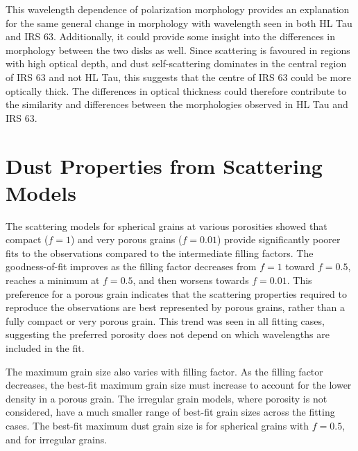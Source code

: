 This wavelength dependence of polarization morphology provides an explanation for the same general change in morphology with wavelength seen in both HL Tau and IRS 63. Additionally, it could provide some insight into the differences in morphology between the two disks as well. Since scattering is favoured in regions with high optical depth, and dust self-scattering dominates in the central region of IRS 63 and not HL Tau, this suggests that the centre of IRS 63 could be more optically thick. The differences in optical thickness could therefore contribute to the similarity and differences between the morphologies observed in HL Tau and IRS 63. 








\section{Dust Properties from Scattering Models}


The scattering models for spherical grains at various porosities showed that compact ($f = 1$) and very porous grains ($f = 0.01$) provide significantly poorer fits to the observations compared to the intermediate filling factors. The goodness-of-fit improves as the filling factor decreases from $f = 1$ toward $f = 0.5$, reaches a minimum at $f = 0.5$, and then worsens towards $f = 0.01$. This preference for a porous grain indicates that the scattering properties required to reproduce the observations are best represented by porous grains, rather than a fully compact or very porous grain. This trend was seen in all fitting cases, suggesting the preferred porosity does not depend on which wavelengths are included in the fit. 




The maximum grain size also varies with filling factor. As the filling factor decreases, the best-fit maximum grain size must increase to account for the lower density in a porous grain. The irregular grain models, where porosity is not considered, have a much smaller range of best-fit grain sizes across the fitting cases. The best-fit maximum dust grain size is \sbest for spherical grains with $f=0.5$, and \ibest for irregular grains.


